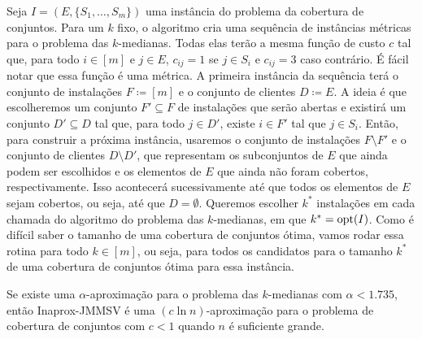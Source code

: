 Seja $I = (E,\{S_1,\ldots,S_m\})$ uma instância do problema da cobertura de conjuntos. Para um $k$ fixo, o algoritmo cria uma sequência de instâncias métricas para o problema das $k$-medianas. Todas elas terão a mesma função de custo $c$ tal que, para todo $i \in [m]$ e $j \in E$, $c_{ij} = 1$ se $j \in S_i$ e $c_{ij} = 3$ caso contrário. É fácil notar que essa função é uma métrica.
A primeira instância da sequência terá o conjunto de instalações $F \coloneqq [m]$ e o conjunto de clientes $D \coloneqq E$. 
A ideia é que escolheremos um conjunto $F' \subseteq F$ de instalações que serão abertas e existirá um conjunto $D' \subseteq D$ tal que, para todo $j \in D'$, existe $i \in F'$ tal que $j \in S_i$. 
Então, para construir a próxima instância, usaremos o conjunto de instalações $F \setminus F'$ e o conjunto de clientes $D \setminus D'$, que representam os subconjuntos de $E$ que ainda podem ser escolhidos e os elementos de $E$ que ainda não foram cobertos, respectivamente.
Isso acontecerá sucessivamente até que todos os elementos de $E$ sejam cobertos, ou seja, até que $D = \emptyset$.
Queremos escolher $k^*$ instalações em cada chamada do algoritmo do problema das $k$-medianas, em que $k^* = \mathrm{opt}(I)$. Como é difícil saber o tamanho de uma cobertura de conjuntos ótima, vamos rodar essa rotina para todo $k \in [m]$, ou seja, para todos os candidatos para o tamanho $k^*$ de uma cobertura de conjuntos ótima para essa instância.

\begin{theorem}
Se existe uma $\alpha$-aproximação para o problema das $k$-medianas com $\alpha < 1.735$, então {\sc Inaprox-JMMSV} é uma $(c \ln n)$-aproximação para o problema de cobertura de conjuntos com $c<1$ quando $n$ é suficiente grande.
\end{theorem}

